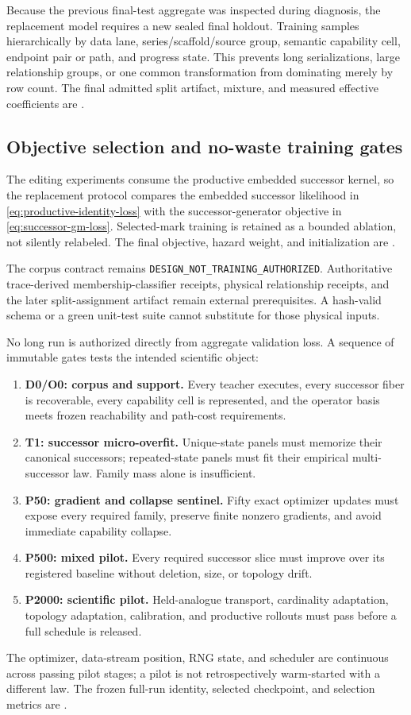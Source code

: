Because the previous final-test aggregate was inspected during diagnosis, the
replacement model requires a new sealed final holdout. Training samples
hierarchically by data lane, series/scaffold/source group, semantic capability
cell, endpoint pair or path, and progress state. This prevents long
serializations, large relationship groups, or one common transformation from
dominating merely by row count. The final admitted split artifact, mixture,
and measured effective coefficients are
.

\subsection{Objective selection and no-waste training gates}
\label{sec:training-gates}

The editing experiments consume the productive embedded successor kernel, so
the replacement protocol compares the embedded successor likelihood in
\eqref{eq:productive-identity-loss} with the successor-generator objective in
\eqref{eq:successor-gm-loss}. Selected-mark training is retained as a bounded
ablation, not silently relabeled. The final objective, hazard weight, and
initialization are .

The corpus contract remains
\texttt{DESIGN\_NOT\_TRAINING\_AUTHORIZED}. Authoritative trace-derived
membership-classifier receipts, physical relationship receipts, and the later
split-assignment artifact remain external prerequisites. A hash-valid schema
or a green unit-test suite cannot substitute for those physical inputs.

No long run is authorized directly from aggregate validation loss. A sequence
of immutable gates tests the intended scientific object:

\begin{enumerate}
  \item \textbf{D0/O0: corpus and support.} Every teacher executes, every
  successor fiber is recoverable, every capability cell is represented, and
  the operator basis meets frozen reachability and path-cost requirements.
  \item \textbf{T1: successor micro-overfit.} Unique-state panels must memorize
  their canonical successors; repeated-state panels must fit their empirical
  multi-successor law. Family mass alone is insufficient.
  \item \textbf{P50: gradient and collapse sentinel.} Fifty exact optimizer
  updates must expose every required family, preserve finite nonzero gradients,
  and avoid immediate capability collapse.
  \item \textbf{P500: mixed pilot.} Every required successor slice must improve
  over its registered baseline without deletion, size, or topology drift.
  \item \textbf{P2000: scientific pilot.} Held-analogue transport, cardinality
  adaptation, topology adaptation, calibration, and productive rollouts must
  pass before a full schedule is released.
\end{enumerate}

The optimizer, data-stream position, RNG state, and scheduler are continuous
across passing pilot stages; a pilot is not retrospectively warm-started with a
different law. The frozen full-run identity, selected checkpoint, and selection
metrics are .
